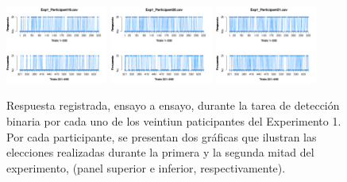 \begin{figure}[th]
\includegraphics[width=0.30\textwidth]{Figures/Response_Exp1_P19} \includegraphics[width=0.30\textwidth]{Figures/Response_Exp1_P20} \includegraphics[width=0.30\textwidth]{Figures/Response_Exp1_P21} 
\caption[Response_Exp1]{Respuesta registrada, ensayo a ensayo, durante la tarea de detección binaria por cada uno de los veintiun paticipantes del Experimento 1. Por cada participante, se presentan dos gráficas que ilustran las elecciones realizadas durante la primera y la segunda mitad del experimento, (panel superior e inferior, respectivamente).}
\label{fig:Response_E1}
\end{figure}

